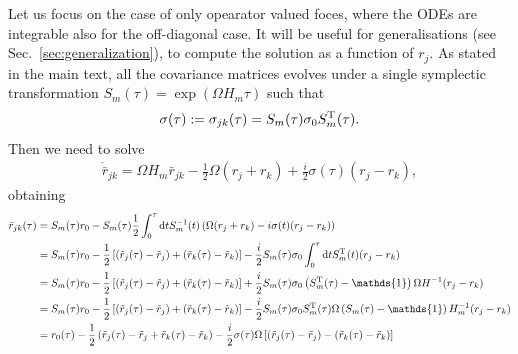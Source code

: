 \documentclass[%
reprint,
superscriptaddress,
nofootinbib,
 amsmath,amssymb,
prx,
floatfix,
]{revtex4-2}
\begin{document}
Let us focus on the case of only opearator valued foces, where the ODEs are integrable also for the off-diagonal case. It will be useful for generalisations (see Sec.~\ref{sec:generalization}), to compute the solution as a function of $r_j$. As stated in the main text, all the covariance matrices evolves under a single symplectic transformation $ S_m (\tau) = \exp(\Omega H_m \tau)$ such that
\begin{equation}
\label{eq:cov_t_force}
   \sigma (\tau) := \sigma_{jk}(\tau)  = S_m (\tau) \sigma_0 S_m^{\rm T} (\tau).
\end{equation}
Then we need to solve 
\begin{align}
    \dot{\bar{r}}_{jk} =     \Omega  H_m  \bar{r}_{jk}  -   \frac{1}{2}\Omega (r_j + r_k) + \frac{i}{2}  \sigma (\tau) (r_j - r_k) ,
\end{align}
obtaining
\begin{align}
\label{eq:app_first_moment_ODE}
    \bar{r}_{jk} (\tau) &= S_m (\tau) r_0  -   S_m(\tau) \frac12 \int_0^{\tau} \text{d} t  S_m^{-1}(t) \left( \Omega (r_j + r_k) - i  \sigma (t) (r_j - r_k)  \right) \nonumber  \\ 
     &= S_m (\tau) r_0 - \frac{1}{2} \left[ (\tilde{r}_j(\tau) - \tilde{r}_j) + (\tilde{r}_k(\tau) - \tilde{r}_k) \right] - \frac{i}{2}  S_m(\tau) \sigma_0 \int_0^{\tau} \text{d} t  S_m^{\rm T}(t)  (r_j - r_k) \nonumber  \\
     &= S_m (\tau) r_0 - \frac{1}{2} \left[ (\tilde{r}_j(\tau) - \tilde{r}_j) + (\tilde{r}_k(\tau) - \tilde{r}_k) \right] + \frac{i}{2}  S_m(\tau) \sigma_0 \left(S_m^{\rm T}(\tau) - \mathds{1} \right)  \Omega  H^{-1} (r_j - r_k) \nonumber \\
     &= S_m (\tau) r_0 - \frac{1}{2} \left[ (\tilde{r}_j(\tau) - \tilde{r}_j) + (\tilde{r}_k(\tau) - \tilde{r}_k )\right] - \frac{i}{2}  S_m(\tau) \sigma_0 S_m^{\rm T}(\tau)   \Omega \left( S_m(\tau)-  \mathds{1}   \right)  H^{-1}_m (r_j - r_k)  \nonumber\\
     &= r_0(\tau) - \frac{1}{2}  \left( \tilde{r}_j(\tau) - \tilde{r}_j + \tilde{r}_k(\tau) - \tilde{r}_k  \right) -  \frac{i}{2} \sigma (\tau)   \Omega  \left[ (\tilde{r}_j (\tau) - \tilde{r}_j)  - (\tilde{r}_k (\tau) - \tilde{r}_k ) \right] 
\end{align}
\end{document}

